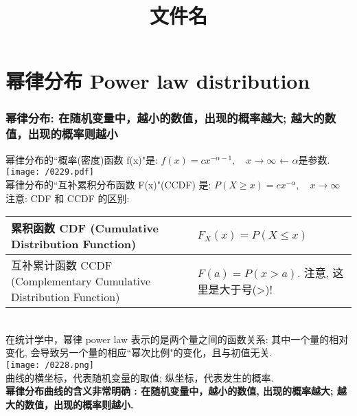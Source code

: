 \documentclass[UTF8]{ctexart}
\title{文件名}
\begin{document}
	\tableofcontents %
	\date{} %
	\maketitle  %
	
	\part{幂律分布 Power law distribution}
	
	\section{幂律分布: 在随机变量中，越小的数值，出现的概率越大; 越大的数值，出现的概率则越小}
	
	幂律分布的``概率(密度)函数 f(x)"是: $\boxed{
		f(x)= cx^{-\alpha -1}, \quad  x \to \infty
	}$ ← $\alpha$是参数. \\

	\texttt{[image: /0229.pdf]} \\

	幂律分布的``互补累积分布函数 F(x)"(CCDF) 是: $\boxed{	P(X \geq x)=cx^{-\alpha}, \quad  x \to \infty }$ \\
	
	注意: CDF 和 CCDF 的区别:  \\
	\begin{tabular}{|p{}|p{}|}
		\hline
		累积函数 CDF (Cumulative Distribution Function) &   $F_X(x)=P(X\leq x)$\\
		\hline
		互补累计函数 CCDF (Complementary Cumulative Distribution Function) & $F(a)=P(x>a)$. 注意, 这里是大于号(>)! \\
		\hline
	\end{tabular} \\

	
	在统计学中，幂律 power law 表示的是两个量之间的函数关系: 其中一个量的相对变化, 会导致另一个量的相应``幂次比例"的变化，且与初值无关. \\
	
	\texttt{[image: /0228.png]} \\
	
	曲线的横坐标，代表随机变量的取值; 纵坐标，代表发生的概率. \\
	\textbf{幂律分布曲线的含义非常明确 : 在随机变量中，越小的数值, 出现的概率越大; 越大的数值，出现的概率则越小.} \\
	
\end{document}
